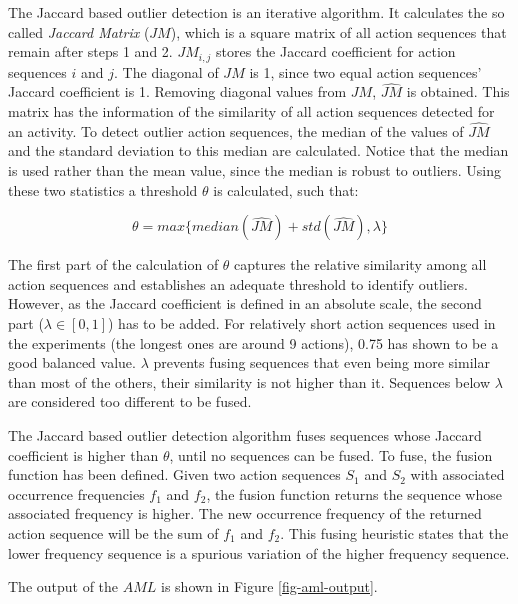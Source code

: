 The Jaccard based outlier detection is an iterative algorithm. It calculates the so called \textit{Jaccard Matrix} ($JM$), which is a square matrix of all action sequences that remain after steps 1 and 2. $JM_{i, j}$ stores the Jaccard coefficient for action sequences $i$ and $j$. The diagonal of $JM$ is 1, since two equal action sequences' Jaccard coefficient is 1. Removing diagonal values from $JM$, $\hat{JM}$ is obtained. This matrix has the information of the similarity of all action sequences detected for an activity. To detect outlier action sequences, the median of the values of $\hat{JM}$ and the standard deviation to this median are calculated. Notice that the median is used rather than the mean value, since the median is robust to outliers. Using these two statistics a threshold $\theta$ is calculated, such that:

\begin{equation}
 \theta = max \{ median(\hat{JM}) + std(\hat{JM}), \lambda \}
\end{equation}

The first part of the calculation of $\theta$ captures the relative similarity among all action sequences and establishes an adequate threshold to identify outliers. However, as the Jaccard coefficient is defined in an absolute scale, the second part ($\lambda \in [0, 1]$) has to be added. For relatively short action sequences used in the experiments (the longest ones are around 9 actions), 0.75 has shown to be a good balanced value. $\lambda$ prevents fusing sequences that even being more similar than most of the others, their similarity is not higher than it. Sequences below $\lambda$ are considered too different to be fused. 

The Jaccard based outlier detection algorithm fuses sequences whose Jaccard coefficient is higher than $\theta$, until no sequences can be fused. To fuse, the fusion function has been defined. Given two action sequences $S_1$ and $S_2$ with associated occurrence frequencies $f_1$ and $f_2$, the fusion function returns the sequence whose associated frequency is higher. The new occurrence frequency of the returned action sequence will be the sum of $f_1$ and $f_2$. This fusing heuristic states that the lower frequency sequence is a spurious variation of the higher frequency sequence.

The output of the $AML$ is shown in Figure \ref{fig-aml-output}.

